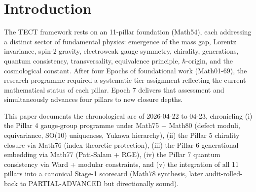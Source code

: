 \maketitle

\section{Introduction}
The TECT framework rests on an 11-pillar foundation (Math54), each addressing a
distinct sector of fundamental physics: emergence of the mass gap, Lorentz
invariance, spin-2 gravity, electroweak gauge symmetry, chirality, generations,
quantum consistency, transversality, equivalence principle, $\hbar$-origin, and
the cosmological constant. After four Epochs of foundational work (Math01-69),
the research programme required a systematic tier assignment reflecting the
current mathematical status of each pillar. Epoch 7 delivers that assessment and
simultaneously advances four pillars to new closure depths.

This paper documents the chronological arc of 2026-04-22 to 04-23, chronicling
(i) the Pillar 4 gauge-group programme under Math75 + Math80 (defect moduli,
equivariance, SO(10) uniqueness, Yukawa hierarchy), (ii) the Pillar 5 chirality
closure via Math76 (index-theoretic protection), (iii) the Pillar 6 generational
embedding via Math77 (Pati-Salam + RGE), (iv) the Pillar 7 quantum consistency
via Ward + modular constraints, and (v) the integration of all 11 pillars into a
canonical Stage-1 scorecard (Math78 synthesis, later audit-rolled-back to
PARTIAL-ADVANCED but directionally sound).

